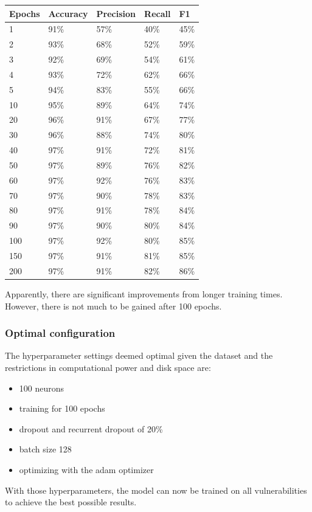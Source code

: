\documentclass[
a4paper,
pagesize,
pdftex,
12pt,
twoside, %
BCOR=5mm, %
ngerman,
fleqn,
final,
]{scrartcl}
\begin{document}
	\begin{tabular}{ | p{2cm} || p{2cm}|p{2cm}|p{2cm}|p{2cm}|  }
		\hline
		Epochs & Accuracy & Precision & Recall & F1 \\
		\hline
		1 & 91\% &  57\% &  40\% &  45\% \\
		2 & 93\% &  68\% &  52\% &  59\% \\
		3 &  92\%&  69\%&   54\%&  61\% \\
		4 &  93\%&  72\%&   62\%&  66\% \\
		5 &  94\%&  83\%&   55\%&  66\% \\
		10 &  95\%&  89\%&   64\%&  74\% \\
		20 &  96\%&  91\%&   67\%&  77\% \\
		30 &  96\%&  88\%&   74\%&  80\% \\
		40 &  97\%&  91\%&   72\%&  81\% \\
		50 &  97\%&  89\%&   76\%&  82\% \\
		60 &  97\%&  92\%&   76\%&  83\% \\
		70 &  97\%&  90\%&   78\%&  83\% \\
		80 &  97\%&  91\%&   78\%&  84\% \\
		90 &  97\%&  90\%&   80\%&  84\% \\
		100 &  97\%&  92\%&   80\%&  85\% \\
		150 &  97\%&  91\%&   81\%&  85\% \\
		200 &  97\%&  91\%&   82\%&  86\% \\
		\hline
		\hline
	\end{tabular}
	
	Apparently, there are significant improvements from longer training times. However, there is not much to be gained after 100 epochs.
	
	\subsubsection{Optimal configuration}
	
	The hyperparameter settings deemed optimal given the dataset and the restrictions in computational power and disk space are:
	\begin{itemize}
		\item 100 neurons
		\item training for 100 epochs
		\item dropout and recurrent dropout of 20\%
		\item batch size 128
		\item optimizing with the adam optimizer
	\end{itemize}
	With those hyperparameters, the model can now be trained on all vulnerabilities to achieve the best possible results.
	
\end{document}
